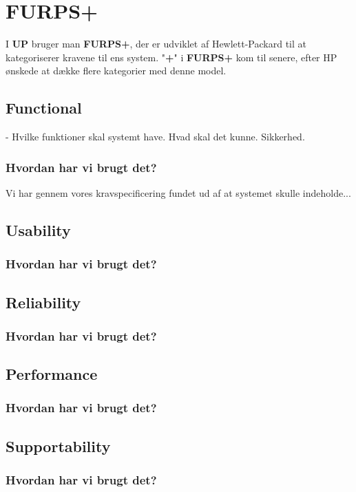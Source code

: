 \section{FURPS+}
I \textbf{UP} bruger man \textbf{FURPS+}, der er udviklet af Hewlett-Packard til at kategoriserer kravene til ens system. "\textbf{+}" i \textbf{FURPS+} kom til senere, efter HP ønskede at dække flere kategorier med denne model.
\subsection{Functional}
- Hvilke funktioner skal systemt have. Hvad skal det kunne. Sikkerhed.
\subsubsection*{Hvordan har vi brugt det?}
Vi har gennem vores kravspecificering fundet ud af at systemet skulle indeholde...
\subsection{Usability}

\subsubsection*{Hvordan har vi brugt det?}
\subsection{Reliability}
\subsubsection*{Hvordan har vi brugt det?}
\subsection{Performance}
\subsubsection*{Hvordan har vi brugt det?}
\subsection{Supportability}
\subsubsection*{Hvordan har vi brugt det?}
